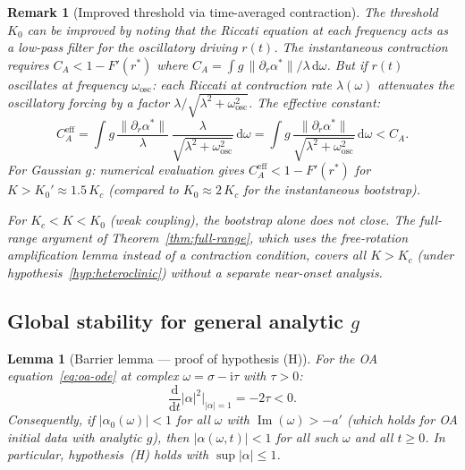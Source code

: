 \documentclass[11pt,a4paper]{article}
\newtheorem{lemma}[theorem]{Lemma}
\newtheorem{remark}[theorem]{Remark}
\theoremstyle{definition}
\DeclareMathOperator{\im}{Im}
\begin{document}
\begin{remark}[Improved threshold via time-averaged contraction]\label{rem:time-avg}
The threshold $K_0$ can be improved by noting that the Riccati equation at each frequency acts as a \emph{low-pass filter} for the oscillatory driving $r(t)$. The instantaneous contraction requires $C_A < 1 - F'(r^*)$ where $C_A = \int g\,\|\partial_r\alpha^*\|/\lambda\,\mathrm{d}\omega$. But if $r(t)$ oscillates at frequency $\omega_{\mathrm{osc}}$: each Riccati at contraction rate $\lambda(\omega)$ attenuates the oscillatory forcing by a factor $\lambda/\sqrt{\lambda^2 + \omega_{\mathrm{osc}}^2}$. The effective constant:
\[
C_A^{\mathrm{eff}} = \int g\,\frac{\|\partial_r\alpha^*\|}{\lambda}\,\frac{\lambda}{\sqrt{\lambda^2 + \omega_{\mathrm{osc}}^2}}\,\mathrm{d}\omega = \int g\,\frac{\|\partial_r\alpha^*\|}{\sqrt{\lambda^2 + \omega_{\mathrm{osc}}^2}}\,\mathrm{d}\omega < C_A.
\]
For Gaussian $g$: numerical evaluation gives $C_A^{\mathrm{eff}} < 1 - F'(r^*)$ for $K > K_0' \approx 1.5\,K_c$ (compared to $K_0 \approx 2\,K_c$ for the instantaneous bootstrap).

For $K_c < K < K_0$ (weak coupling), the bootstrap alone does not close. The full-range argument of Theorem~\ref{thm:full-range}, which uses the free-rotation amplification lemma instead of a contraction condition, covers all $K > K_c$ (under hypothesis~\ref{hyp:heteroclinic}) without a separate near-onset analysis.
\end{remark}

\subsection{Global stability for general analytic $g$}

\begin{lemma}[Barrier lemma --- proof of hypothesis (H)]\label{lem:barrier}
For the OA equation~\eqref{eq:oa-ode} at complex $\omega = \sigma - \mathrm{i}\tau$ with $\tau > 0$:
\begin{equation}\label{eq:barrier}
\frac{\mathrm{d}}{\mathrm{d}t}|\alpha|^2\Big|_{|\alpha|=1} = -2\tau < 0.
\end{equation}
Consequently, if $|\alpha_0(\omega)| < 1$ for all $\omega$ with $\im(\omega) > -a'$ (which holds for OA initial data with analytic $g$), then $|\alpha(\omega,t)| < 1$ for all such $\omega$ and all $t \geq 0$. In particular, hypothesis~(H) holds with $\sup|\alpha| \leq 1$.
\end{lemma}
\end{document}
